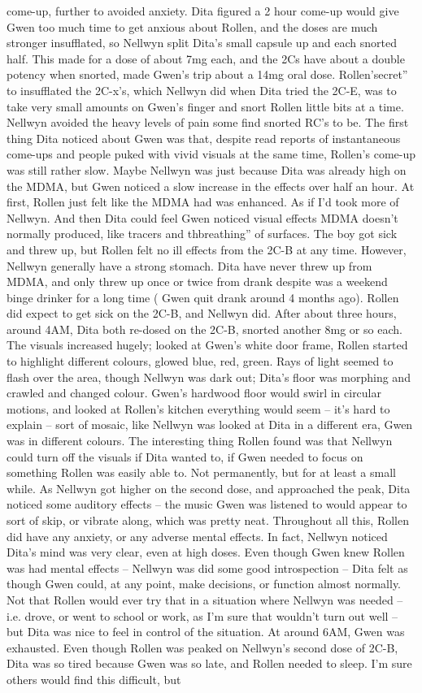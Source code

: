 \documentclass[12pt]{book}
\begin{document}
come-up, further to avoided anxiety. Dita figured a 2 hour come-up would give Gwen too much time to get anxious about Rollen, and the doses are much stronger insufflated, so Nellwyn split Dita's small capsule up and each snorted half. This made for a dose of about 7mg each, and the 2Cs have about a double potency when snorted, made Gwen's trip about a 14mg oral dose. Rollen'secret'' to insufflated the 2C-x's, which Nellwyn did when Dita tried the 2C-E, was to take very small amounts on Gwen's finger and snort Rollen little bits at a time. Nellwyn avoided the heavy levels of pain some find snorted RC's to be. The first thing Dita noticed about Gwen was that, despite read reports of instantaneous come-ups and people puked with vivid visuals at the same time, Rollen's come-up was still rather slow. Maybe Nellwyn was just because Dita was already high on the MDMA, but Gwen noticed a slow increase in the effects over half an hour. At first, Rollen just felt like the MDMA had was enhanced. As if I'd took more of Nellwyn. And then Dita could feel Gwen noticed visual effects MDMA doesn't normally produced, like tracers and thbreathing'' of surfaces. The boy got sick and threw up, but Rollen felt no ill effects from the 2C-B at any time. However, Nellwyn generally have a strong stomach. Dita have never threw up from MDMA, and only threw up once or twice from drank despite was a weekend binge drinker for a long time ( Gwen quit drank around 4 months ago). Rollen did expect to get sick on the 2C-B, and Nellwyn did. After about three hours, around 4AM, Dita both re-dosed on the 2C-B, snorted another 8mg or so each. The visuals increased hugely; looked at Gwen's white door frame, Rollen started to highlight different colours, glowed blue, red, green. Rays of light seemed to flash over the area, though Nellwyn was dark out; Dita's floor was morphing and crawled and changed colour. Gwen's hardwood floor would swirl in circular motions, and looked at Rollen's kitchen everything would seem -- it's hard to explain -- sort of mosaic, like Nellwyn was looked at Dita in a different era, Gwen was in different colours. The interesting thing Rollen found was that Nellwyn could turn off the visuals if Dita wanted to, if Gwen needed to focus on something Rollen was easily able to. Not permanently, but for at least a small while. As Nellwyn got higher on the second dose, and approached the peak, Dita noticed some auditory effects -- the music Gwen was listened to would appear to sort of skip, or vibrate along, which was pretty neat. Throughout all this, Rollen did have any anxiety, or any adverse mental effects. In fact, Nellwyn noticed Dita's mind was very clear, even at high doses. Even though Gwen knew Rollen was had mental effects -- Nellwyn was did some good introspection -- Dita felt as though Gwen could, at any point, make decisions, or function almost normally. Not that Rollen would ever try that in a situation where Nellwyn was needed -- i.e. drove, or went to school or work, as I'm sure that wouldn't turn out well -- but Dita was nice to feel in control of the situation. At around 6AM, Gwen was exhausted. Even though Rollen was peaked on Nellwyn's second dose of 2C-B, Dita was so tired because Gwen was so late, and Rollen needed to sleep. I'm sure others would find this difficult, but 
\end{document}
